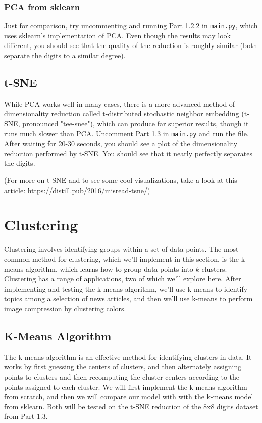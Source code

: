 \documentclass{article}
\begin{document}
\subsubsection{PCA from sklearn}

Just for comparison, try uncommenting and running Part 1.2.2 in \texttt{main.py}, which uses sklearn's implementation of PCA. Even though the results may look different, you should see that the quality of the reduction is roughly similar (both separate the digits to a similar degree).

\subsection{t-SNE}

While PCA works well in many cases, there is a more advanced method of dimensionality reduction called t-distributed stochastic neighbor embedding (t-SNE, pronounced "tee-snee"), which can produce far superior results, though it runs much slower than PCA. Uncomment Part 1.3 in \texttt{main.py} and run the file. After waiting for 20-30 seconds, you should see a plot of the dimensionality reduction performed by t-SNE. You should see that it nearly perfectly separates the digits.

(For more on t-SNE and to see some cool visualizations, take a look at this article: \url{https://distill.pub/2016/misread-tsne/})

\section{Clustering}

Clustering involves identifying groups within a set of data points. The most common method for clustering, which we'll implement in this section, is the k-means algorithm, which learns how to group data points into $k$ clusters. Clustering has a range of applications, two of which we'll explore here. After implementing and testing the k-means algorithm, we'll use k-means to identify topics among a selection of news articles, and then we'll use k-means to perform image compression by clustering colors.

\subsection{K-Means Algorithm}

The k-means algorithm is an effective method for identifying clusters in data. It works by first guessing the centers of clusters, and then alternately assigning points to clusters and then recomputing the cluster centers according to the points assigned to each cluster. We will first implement the k-means algorithm from scratch, and then we will compare our model with with the k-means model from sklearn. Both will be tested on the t-SNE reduction of the 8x8 digits dataset from Part 1.3.
\end{document}
